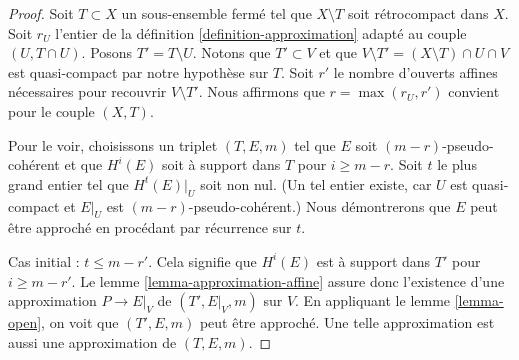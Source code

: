 \begin{proof}
Soit $T \subset X$ un sous-ensemble fermé tel que $X \setminus T$ soit rétrocompact
dans $X$. Soit $r_U$ l'entier de la définition \ref{definition-approximation}
adapté au couple $(U, T \cap U)$.
Posons $T' = T \setminus U$. Notons que
$T' \subset V$ et que $V \setminus T' = (X \setminus T) \cap U \cap V$
est quasi-compact par notre hypothèse sur $T$.
Soit $r'$ le nombre d'ouverts affines nécessaires pour recouvrir $V \setminus T'$.
Nous affirmons que $r = \max(r_U, r')$ convient pour le couple $(X, T)$.

\medskip\noindent
Pour le voir, choisissons un triplet $(T, E, m)$ tel que $E$ soit
$(m - r)$-pseudo-cohérent et que $H^i(E)$ soit à support dans $T$ pour
$i \geq m - r$. Soit $t$ le plus grand entier tel que
$H^t(E)|_U$ soit non nul. (Un tel entier existe, car $U$ est quasi-compact
et $E|_U$ est $(m - r)$-pseudo-cohérent.)
Nous démontrerons que $E$ peut être approché en procédant par récurrence sur $t$.

\medskip\noindent
Cas initial : $t \leq m - r'$. Cela signifie que $H^i(E)$ est à support
dans $T'$ pour $i \geq m - r'$. Le
lemme \ref{lemma-approximation-affine}
assure donc l'existence d'une approximation
$P \to E|_V$ de $(T', E|_V, m)$ sur $V$.
En appliquant le lemme \ref{lemma-open}, on voit que
$(T', E, m)$ peut être approché. Une telle approximation
est aussi une approximation de $(T, E, m)$.


\end{proof}
